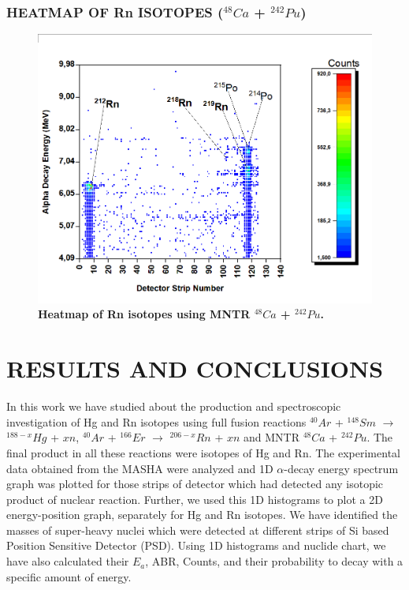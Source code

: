 \documentclass[12pt]{article}
\begin{document}
\subsubsection{HEATMAP OF Rn ISOTOPES ($^{48}Ca$ + $^{242}Pu$)}
\begin{figure}[h]
\centering
\includegraphics[scale=0.5]{Heatmap_Rn(212,218,219).png}
\caption{\textbf{Heatmap of Rn isotopes using MNTR $^{48}Ca$ + $^{242}Pu$.}}
\label{Heatmap of Rn(212, 218, 219) isotopes.}
\end{figure}

\section{RESULTS AND CONCLUSIONS}
In this work we have studied about the production and spectroscopic investigation of Hg and Rn isotopes using full fusion reactions $^{40}Ar$ + $^{148}Sm$ $\rightarrow$ $^{188-x}Hg$ + $xn$, $^{40}Ar$ + $^{166}Er$ $\rightarrow$ $^{206-x}Rn$ + $xn$  and MNTR $^{48}Ca$ + $^{242}Pu$. The final product in all these reactions were isotopes of Hg and Rn. The experimental data obtained from the MASHA were analyzed and 1D $\alpha$-decay energy spectrum graph was plotted for those strips of detector which had detected any isotopic product of nuclear reaction. Further, we used this 1D histograms to plot a 2D energy-position graph, separately for Hg and Rn isotopes. We have identified the masses of super-heavy nuclei which were detected at different strips of Si based Position Sensitive Detector (PSD). Using 1D histograms and nuclide chart, we have also calculated their $E_a$, ABR, Counts, and their probability to decay with a specific amount of energy.
\end{document}
